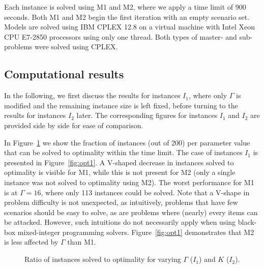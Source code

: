 \documentclass[a4paper,11pt,abstracton]{scrartcl}
\theoremstyle{definition}
\theoremstyle{remark}
\begin{document}
Each instance is solved using M1 and M2, where we apply a time limit of 900 seconds. 
Both M1 and M2 begin the first iteration with an empty scenario set.
Models are solved using IBM CPLEX 12.8 on a virtual machine with Intel Xeon CPU E7-2850 processors using only one thread. Both types of master- and sub-problems were solved using CPLEX.

\subsection{Computational results}

In the following, we first discuss the results for instances $I_1$, where only $\Gamma$ is modified and the remaining instance size is left fixed, before turning to the results for instances $I_2$ later. The corresponding figures for instances $I_1$ and $I_2$ are provided side by side for ease of comparison.

In Figure~\ref{fig:opt} we show the fraction of instances (out of 200) per parameter value that can be solved to optimality within the time limit. The case of instances $I_1$ is presented in Figure~\ref{fig:opt1}. A V-shaped decrease in instances solved to optimality is visible for M1, while this is not present for M2 (only a single instance was not solved to optimality using M2). The worst performance for M1 is at $\Gamma=16$, where only 113 instances could be solved. 
Note that a V-shape in problem difficulty is not unexpected, as intuitively, problems that have few scenarios should be easy to solve, as are problems where (nearly) every items can be attacked. However, such intuitions do not necessarily apply when using black-box mixed-integer programming solvers.
Figure~\ref{fig:opt1} demonstrates that M2 is less affected by $\Gamma$ than M1. 

\begin{figure}[htb]
\begin{center}
%
\hfill
{}
\end{center}
\caption{Ratio of instances solved to optimality for varying $\Gamma$ ($I_1$) and $K$ ($I_2$).\label{fig:opt}}
\end{figure}
\end{document}
